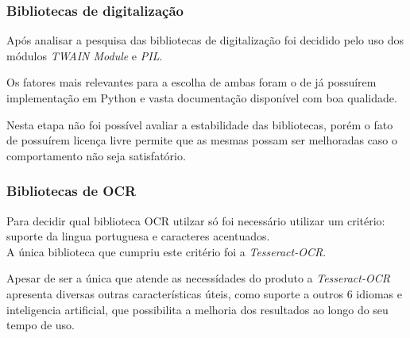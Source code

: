 \subsubsection{Bibliotecas de digitalização}
Após analisar a pesquisa das bibliotecas de digitalização foi decidido pelo
uso dos módulos \emph{TWAIN Module} e \emph{PIL}.

Os fatores mais relevantes para a escolha de ambas foram o de já possuírem 
implementação em Python e vasta documentação disponível com boa qualidade.

Nesta etapa não foi possível avaliar a estabilidade das bibliotecas, porém
o fato de possuírem licença livre permite que as mesmas possam ser
melhoradas caso o comportamento não seja satisfatório.

\subsubsection{Bibliotecas de OCR}
Para decidir qual biblioteca OCR utilzar só foi necessário utilizar um critério:
suporte da lingua portuguesa e caracteres acentuados.\\ 
A única biblioteca que cumpriu este critério foi a \emph{Tesseract-OCR}.

Apesar de ser a única que atende as necessídades do produto a
\emph{Tesseract-OCR} apresenta diversas outras características úteis, como
suporte a outros 6 idiomas e inteligencia artificial, que possibilita a
melhoria dos resultados ao longo do seu tempo de uso. 
